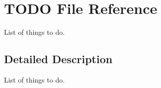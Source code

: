 \section{T\-O\-D\-O File Reference}
\label{TODO}


List of things to do.  




\subsection{Detailed Description}
List of things to do. 